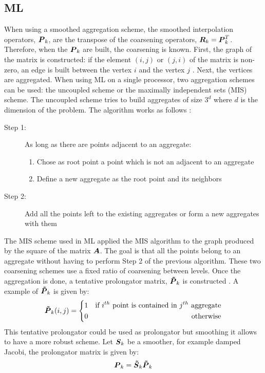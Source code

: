 \subsection{ML}
When using a smoothed aggregation scheme, the smoothed interpolation operators,
$\boldsymbol{P}_k$, are the transpose of the coarsening operators,
$\boldsymbol{R}_k=\boldsymbol{P}_k^T$. Therefore, when the $\boldsymbol{P}_k$ are built, the
coarsening is known. First, the graph of the matrix is constructed: if the element
$(i,j)$ or $(j,i)$ of the matrix is non-zero, an edge is built between the
vertex $i$ and the vertex $j$ \cite{ml_guide}. Next, the vertices are
aggregated. When using ML on a single processor, two aggregation schemes can
be used: the uncoupled scheme or the maximally independent sets (MIS) scheme. 
The uncoupled scheme tries to build aggregates of size $3^d$ where $d$ is the
dimension of the problem. The algorithm works as follows \cite{mis}:
\begin{description}
  \item[Step 1:] As long as there are points adjacent to an aggregate:
    \begin{enumerate}
      \item Chose as root point a point which is not an adjacent to an
        aggregate
      \item Define a new aggregate as the root point and its neighbors 
    \end{enumerate}
  \item[Step 2:] Add all the points left to the existing aggregates or form a
    new aggregates with them
\end{description}
The MIS scheme used in ML applied the MIS algorithm \cite{graph_coloring} to
the graph produced by the square of the matrix $\boldsymbol{A}$. The goal is that all
the points belong to an aggregate without having to perform Step 2 of the
previous algorithm. These two coarsening schemes use a fixed ratio of 
coarsening between levels. Once the aggregation is done, a tentative
prolongator matrix, $\boldsymbol{\tilde{P}}_k$ is constructed \cite{mis}. A example of
$\boldsymbol{\tilde{P}}_k$ is given by:
\begin{equation}
  \boldsymbol{\tilde{P}}_k(i,j) = \left\{
  \begin{aligned}
    &1 &\textrm{if }i^{th}\textrm{ point is contained in }j^{th}\textrm{
    aggregate}\\
    & 0 &\textrm{otherwise}
  \end{aligned}
  \right.
\end{equation}
This tentative prolongator could be used as prolongator but smoothing it
allows to have a more robust scheme. Let $\boldsymbol{S}_k$ be a smoother, for example
damped Jacobi, the prolongator matrix is given by:
\begin{equation}
  \boldsymbol{P}_k = \boldsymbol{\tilde{S}}_k \boldsymbol{\tilde{P}}_k
\end{equation}


